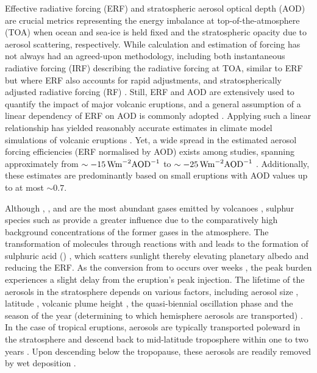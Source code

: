\documentclass[draft]{agujournal2019}
\begin{document}
  Effective radiative forcing (ERF) and stratospheric aerosol optical depth (AOD) are
  crucial metrics representing the energy imbalance at top-of-the-atmosphere (TOA) when
  ocean and sea-ice is held fixed and the stratospheric opacity due to aerosol
  scattering, respectively. While calculation and estimation of forcing has not always
  had an agreed-upon methodology, including both instantaneous radiative forcing (IRF)
  describing the radiative forcing at TOA, similar to ERF but where ERF also accounts
  for rapid adjustments, and stratospherically adjusted radiative forcing (RF)
  \cite{forster2016}. Still, ERF and AOD are extensively used to quantify the impact of
  major volcanic eruptions, and a general assumption of a linear dependency of ERF on
  AOD is commonly adopted \cite{myhre2013,andersson2015}. Applying such a linear
  relationship has yielded reasonably accurate estimates in climate model simulations of
  volcanic eruptions \cite{mills2017,hansen2005,gregory2016,marshall2020,pitari2016b}.
  Yet, a wide spread in the estimated aerosol forcing efficiencies (ERF normalised by
  AOD) exists among studies, spanning approximately from \(\sim
  \SI{-15}{\watt\metre^{-2}\ce{AOD}^{-1}}\) \cite{pitari2016b} to 
  \(\sim \SI{-25}{\watt\metre^{-2}\ce{AOD}^{-1}}\) \cite{hansen2005b}. Additionally,
  these estimates are predominantly based on small eruptions with AOD values up to at
  most \(\sim 0.7\).

  Although , , and  are the most abundant gases emitted by
  volcanoes \cite{robock2000}, sulphur species such as  provide a greater
  influence due to the comparatively high background concentrations of the former gases
  in the atmosphere. The transformation of  molecules through reactions with
   and  leads to the formation of sulphuric acid ()
  \cite{pinto1989,zhao1995}, which scatters sunlight thereby elevating planetary albedo
  and reducing the ERF. As the conversion from  to 
   occurs over weeks 
  \cite{pinto1989,zhao1995}, the peak  burden experiences a slight delay from
  the eruption's peak  injection. The lifetime of the  aerosols in the
  stratosphere depends on various factors, including aerosol size
  \cite{rampino1982,pinto1989,marshall2019}, latitude \cite{marshall2019, toohey2019},
  volcanic plume height \cite{marshall2019}, the quasi-biennial oscillation phase
  \cite{pitari2016b} and the season of the year (determining to which hemisphere
  aerosols are transported) \cite{toohey2011,toohey2019}. In the case of tropical
  eruptions, aerosols are typically transported poleward in the stratosphere and descend
  back to mid-latitude troposphere within one to two years \cite{robock2000}. Upon
  descending below the tropopause, these aerosols are readily removed by wet deposition
  \cite{liu2012}.
\end{document}
